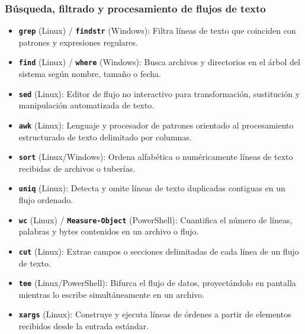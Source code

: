 \documentclass[12pt]{article}
\begin{document}
\subsubsection{Búsqueda, filtrado y procesamiento de flujos de texto}
\begin{itemize}[leftmargin=*, noitemsep, topsep=2pt]
    \item \textbf{\texttt{grep}} (Linux) / \textbf{\texttt{findstr}} (Windows): Filtra líneas de texto que coinciden con patrones y expresiones regulares.
    \item \textbf{\texttt{find}} (Linux) / \textbf{\texttt{where}} (Windows): Busca archivos y directorios en el árbol del sistema según nombre, tamaño o fecha.
    \item \textbf{\texttt{sed}} (Linux): Editor de flujo no interactivo para transformación, sustitución y manipulación automatizada de texto.
    \item \textbf{\texttt{awk}} (Linux): Lenguaje y procesador de patrones orientado al procesamiento estructurado de texto delimitado por columnas.
    \item \textbf{\texttt{sort}} (Linux/Windows): Ordena alfabética o numéricamente líneas de texto recibidas de archivos o tuberías.
    \item \textbf{\texttt{uniq}} (Linux): Detecta y omite líneas de texto duplicadas contiguas en un flujo ordenado.
    \item \textbf{\texttt{wc}} (Linux) / \textbf{\texttt{Measure-Object}} (PowerShell): Cuantifica el número de líneas, palabras y bytes contenidos en un archivo o flujo.
    \item \textbf{\texttt{cut}} (Linux): Extrae campos o secciones delimitadas de cada línea de un flujo de texto.
    \item \textbf{\texttt{tee}} (Linux/PowerShell): Bifurca el flujo de datos, proyectándolo en pantalla mientras lo escribe simultáneamente en un archivo.
    \item \textbf{\texttt{xargs}} (Linux): Construye y ejecuta líneas de órdenes a partir de elementos recibidos desde la entrada estándar.
\end{itemize}
\end{document}
